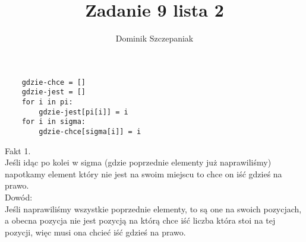 \documentclass[12pt]{article}
\title{Zadanie 9 lista 2}
\author{Dominik Szczepaniak}
\date{}
\begin{document}
\maketitle
\begin{lstlisting}
    gdzie-chce = []
    gdzie-jest = []
    for i in pi:
        gdzie-jest[pi[i]] = i
    for i in sigma:
        gdzie-chce[sigma[i]] = i 
\end{lstlisting}

Fakt 1.\\
Jeśli idąc po kolei w sigma (gdzie poprzednie elementy już naprawiliśmy) napotkamy element który nie jest na swoim miejscu to chce on iść gdzieś na prawo.\\
Dowód:\\
Jeśli naprawiliśmy wszystkie poprzednie elementy, to są one na swoich pozycjach, a obecna pozycja nie jest pozycją na którą chce iść liczba która stoi na tej pozycji, więc musi ona chcieć iść gdzieś na prawo.\\
\end{document}
